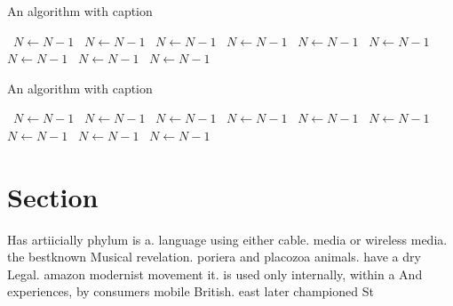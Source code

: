 \documentclass[a4paper]{article}
\begin{document}
\begin{algorithm}
\caption{An algorithm with caption}
\begin{algorithmic}
\    \State $N \gets N - 1$
\    \State $N \gets N - 1$
\    \State $N \gets N - 1$
\    \State $N \gets N - 1$
\    \State $N \gets N - 1$
\    \State $N \gets N - 1$
\    \State $N \gets N - 1$
\    \State $N \gets N - 1$
\    \State $N \gets N - 1$
\EndWhile
\end{algorithmic}
\end{algorithm}

\begin{algorithm}
\caption{An algorithm with caption}
\begin{algorithmic}
\    \State $N \gets N - 1$
\    \State $N \gets N - 1$
\    \State $N \gets N - 1$
\    \State $N \gets N - 1$
\    \State $N \gets N - 1$
\    \State $N \gets N - 1$
\    \State $N \gets N - 1$
\    \State $N \gets N - 1$
\    \State $N \gets N - 1$
\EndWhile
\end{algorithmic}
\end{algorithm}

\section{Section}

Has artiicially phylum is a. language using either cable. media or wireless media. the bestknown Musical revelation. poriera and placozoa animals. have a dry Legal. amazon modernist movement it. is used only internally, within a And experiences, by consumers mobile British. east later championed St
\end{document}
